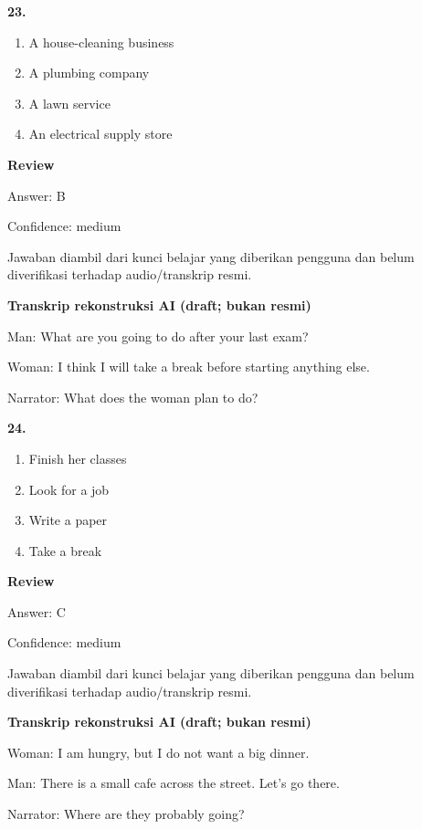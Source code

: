 \documentclass[12pt]{article}
\begin{document}
\noindent\textbf{23.}
\begin{enumerate}[label=(\Alph*),leftmargin=*,itemsep=0.2em]
\item A house-cleaning business
\item A plumbing company
\item A lawn service
\item An electrical supply store
\end{enumerate}
\par
\begingroup
\setlength{\parskip}{0pt}
\setlength{\parindent}{0pt}
\textbf{Review}\par
Answer: B\par
Confidence: medium\par
Jawaban diambil dari kunci belajar yang diberikan pengguna dan belum diverifikasi terhadap audio/transkrip resmi.\par
\endgroup
\par
\vspace{0.25\baselineskip}
\begin{exampleblock}
\textbf{Transkrip rekonstruksi AI (draft; bukan resmi)}\par
Man: What are you going to do after your last exam?\par
Woman: I think I will take a break before starting anything else.\par
Narrator: What does the woman plan to do?\par
\end{exampleblock}
\noindent\textbf{24.}
\begin{enumerate}[label=(\Alph*),leftmargin=*,itemsep=0.2em]
\item Finish her classes
\item Look for a job
\item Write a paper
\item Take a break
\end{enumerate}
\par
\begingroup
\setlength{\parskip}{0pt}
\setlength{\parindent}{0pt}
\textbf{Review}\par
Answer: C\par
Confidence: medium\par
Jawaban diambil dari kunci belajar yang diberikan pengguna dan belum diverifikasi terhadap audio/transkrip resmi.\par
\endgroup
\par
\vspace{0.25\baselineskip}
\begin{exampleblock}
\textbf{Transkrip rekonstruksi AI (draft; bukan resmi)}\par
Woman: I am hungry, but I do not want a big dinner.\par
Man: There is a small cafe across the street. Let's go there.\par
Narrator: Where are they probably going?\par
\end{exampleblock}
\end{document}
